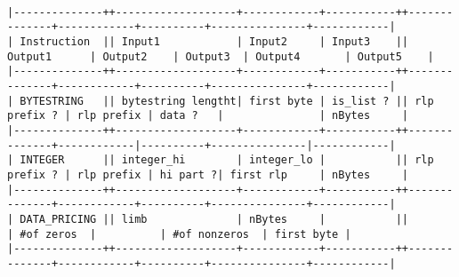 \documentclass[varwidth=\maxdimen,margin=0.5cm,multi={verbatim}]{standalone}
\begin{document}
\begin{verbatim}

|--------------++-------------------+------------+-----------++--------------+------------+----------+---------------+------------|
| Instruction  || Input1            | Input2     | Input3    || Output1      | Output2    | Output3  | Output4       | Output5    |
|--------------++-------------------+------------+-----------++--------------+------------+----------+---------------+------------|
| BYTESTRING   || bytestring lengtht| first byte | is_list ? || rlp prefix ? | rlp prefix | data ?   |               | nBytes     |
|--------------++-------------------+------------+-----------++--------------+------------|----------+---------------|------------|
| INTEGER      || integer_hi        | integer_lo |           || rlp prefix ? | rlp prefix | hi part ?| first rlp     | nBytes     |
|--------------++-------------------+------------+-----------++--------------+------------+----------+---------------+------------|
| DATA_PRICING || limb              | nBytes     |           ||              | #of zeros  |          | #of nonzeros  | first byte |
|--------------++-------------------+------------+-----------++--------------+------------+----------+---------------+------------|


\end{verbatim}
\end{document}
